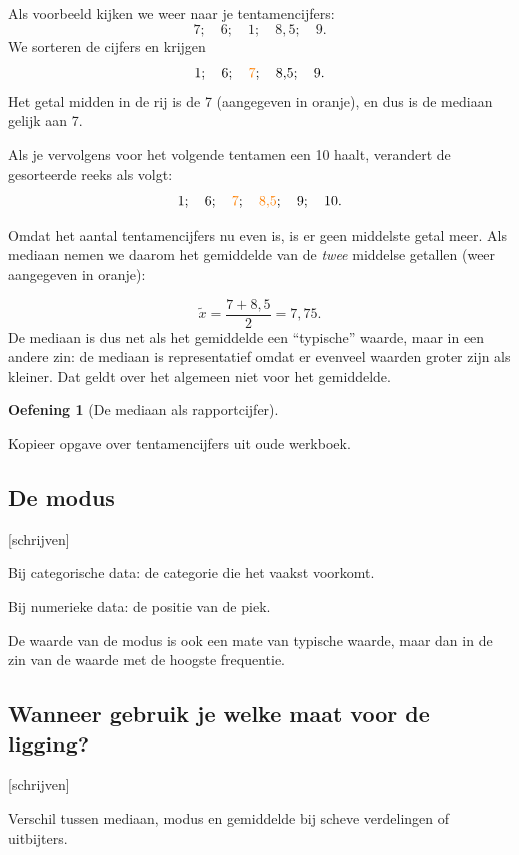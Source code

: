 \documentclass[
  a4paper,
]{scrbook}
\theoremstyle{definition}
\newtheorem{exercise}{Oefening}[chapter]
\theoremstyle{definition}
\theoremstyle{remark}
\begin{document}
Als voorbeeld kijken we weer naar je tentamencijfers:
\[7;\quad 6;\quad 1;\quad 8{,}5;\quad 9.\] We sorteren de cijfers en
krijgen \[1;\quad 6;\quad {\color{orange}7};\quad 8{,}5;\quad 9.\] Het
getal midden in de rij is de 7 (aangegeven in oranje), en dus is de
mediaan gelijk aan 7.

Als je vervolgens voor het volgende tentamen een 10 haalt, verandert de
gesorteerde reeks als volgt:
\[1;\quad 6;\quad {\color{orange}7};\quad {\color{orange}8{,}5};\quad 9; \quad 10.\]

Omdat het aantal tentamencijfers nu even is, is er geen middelste getal
meer. Als mediaan nemen we daarom het gemiddelde van de \emph{twee}
middelse getallen (weer aangegeven in oranje):

\[\tilde{x}=\frac{7 + 8{,}5}{2} = 7,75.\] De mediaan is dus net als het
gemiddelde een ``typische'' waarde, maar in een andere zin: de mediaan
is representatief omdat er evenveel waarden groter zijn als kleiner. Dat
geldt over het algemeen niet voor het gemiddelde.

\begin{exercise}[De mediaan als
rapportcijfer]\protect\hypertarget{exr-mediaan}{}\label{exr-mediaan}

Kopieer opgave over tentamencijfers uit oude werkboek.

\end{exercise}

\subsection{De modus}\label{de-modus}

{[}schrijven{]}

Bij categorische data: de categorie die het vaakst voorkomt.

Bij numerieke data: de positie van de piek.

De waarde van de modus is ook een mate van typische waarde, maar dan in
de zin van de waarde met de hoogste frequentie.

\subsection{Wanneer gebruik je welke maat voor de
ligging?}\label{wanneer-gebruik-je-welke-maat-voor-de-ligging}

{[}schrijven{]}

Verschil tussen mediaan, modus en gemiddelde bij scheve verdelingen of
uitbijters.
\end{document}
